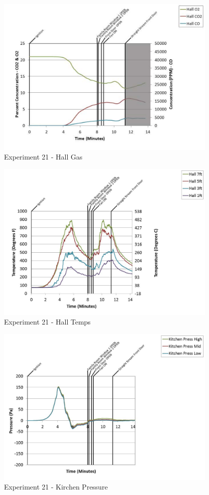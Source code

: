 \documentclass{article}
\begin{document}
\begin{appendices}
	\begin{figure}[h!]
		\centering
		\includegraphics[height=3.05in]{0_Images/Results_Charts/Exp_21_Charts/HallGas.pdf}
		\caption{Experiment 21 - Hall Gas}
	\end{figure}
 
	\clearpage

	\begin{figure}[h!]
		\centering
		\includegraphics[height=3.05in]{0_Images/Results_Charts/Exp_21_Charts/HallTemps.pdf}
		\caption{Experiment 21 - Hall Temps}
	\end{figure}
 

	\begin{figure}[h!]
		\centering
		\includegraphics[height=3.05in]{0_Images/Results_Charts/Exp_21_Charts/KirchenPressure.pdf}
		\caption{Experiment 21 - Kirchen Pressure}
	\end{figure}
 

\end{appendices}
\end{document}
